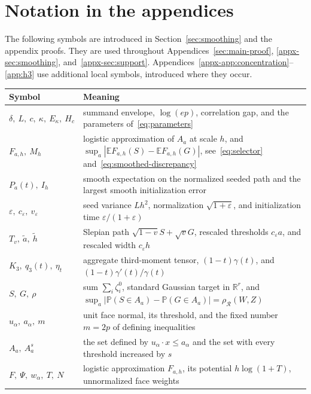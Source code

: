 \documentclass[11pt,letterpaper]{article}
\theoremstyle{remark}
\newcommand{\E}{\mathbb E}
\newcommand{\Pp}{\mathbb P}
\newcommand{\R}{\mathbb R}
\newcommand{\rh}{\rho_{\mathcal R}}
\begin{document}
\section*{Notation in the appendices}
The following symbols are introduced in Section~\ref{sec:smoothing}
and the appendix proofs. They are used throughout
Appendices~\ref{sec:main-proof}, \ref{appx-sec:smoothing},
and~\ref{appx-sec:support}.
Appendices~\ref{appx-app:concentration}--\ref{app:h3}
use additional local symbols, introduced
where they occur.

\medskip
\begingroup
\small
\renewcommand{\arraystretch}{1.15}
\begin{longtable}{@{}p{}p{}@{}}
\textbf{Symbol} & \textbf{Meaning}\\
\endhead
\(\delta,\ L,\ c,\ \kappa,\ E_\kappa,\ H_c\) & summand envelope,
\(\log(ep)\), correlation gap, and the parameters
of~\eqref{eq:parameters}\\
\(F_{a,h},\ M_h\) & logistic approximation of \(A_a\) at scale
\(h\), and \(\sup_a|\E F_{a,h}(S)-\E F_{a,h}(G)|\),
see~\eqref{eq:selector} and~\eqref{eq:smoothed-discrepancy}\\
\(P_a(t),\ I_h\) & smooth expectation on the normalized seeded
path and the largest smooth initialization error\\
\(\varepsilon,\ c_\varepsilon,\ v_\varepsilon\) & seed variance
\(Lh^2\), normalization \(\sqrt{1+\varepsilon}\), and initialization
time \(\varepsilon/(1+\varepsilon)\)\\
\(T_v,\ \widetilde a,\ \widetilde h\) & Slepian path
\(\sqrt{1-v}S+\sqrt vG\), rescaled thresholds \(c_\varepsilon a\),
and rescaled width \(c_\varepsilon h\)\\
\(K_3,\ q_3(t),\ \eta_t\) & aggregate third-moment tensor,
\((1-t)\gamma(t)\), and \((1-t)\gamma'(t)/\gamma(t)\)\\
\(S,\ G,\ \rho\) & sum \(\sum_i\zeta_i^0\), standard Gaussian target
in \(\R^r\), and \(\sup_a|\Pp(S\in A_a)-\Pp(G\in A_a)|=\rh(W,Z)\)\\
\(u_\alpha,\ a_\alpha,\ m\) & unit face normal, its threshold, and
the fixed number \(m=2p\) of defining inequalities\\
\(A_a,\ A_a^s\) & the set defined by \(u_\alpha\cdot x\le a_\alpha\)
and the set with every threshold increased by \(s\)\\
\(F,\ \Psi,\ w_\alpha,\ T,\ N\) & logistic approximation \(F_{a,h}\), its potential
\(h\log(1+T)\), unnormalized face weights

\end{longtable}
\end{document}
